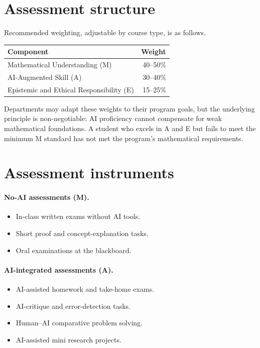 \documentclass{SIAMbook2023}
\begin{document}
\section{Assessment structure}

Recommended weighting, adjustable by course type, is as follows.

\begin{center}
\begin{tabular}{lr}
\toprule
\textbf{Component} & \textbf{Weight} \\
\midrule
Mathematical Understanding (M) & 40--50\% \\
AI-Augmented Skill (A) & 30--40\% \\
Epistemic and Ethical Responsibility (E) & 15--25\% \\
\bottomrule
\end{tabular}
\end{center}

Departments may adapt these weights to their program goals, but the underlying principle is non-negotiable: AI proficiency cannot compensate for weak mathematical foundations. A student who excels in A and E but fails to meet the minimum M standard has not met the program's mathematical requirements.

\section{Assessment instruments}

\paragraph{No-AI assessments (M).}
\begin{itemize}
\item In-class written exams without AI tools.
\item Short proof and concept-explanation tasks.
\item Oral examinations at the blackboard.
\end{itemize}

\paragraph{AI-integrated assessments (A).}
\begin{itemize}
\item AI-assisted homework and take-home exams.
\item AI-critique and error-detection tasks.
\item Human--AI comparative problem solving.
\item AI-assisted mini research projects.
\end{itemize}
\end{document}
